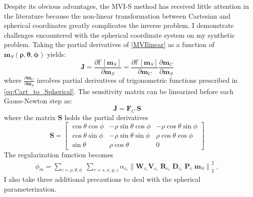 Despite its obvious advantages, the MVI-S method has received little attention in the literature because the non-linear transformation between Cartesian and spherical coordinates greatly complicates the inverse problem.
I demonstrate challenges encountered with the spherical coordinate system on my synthetic problem.
Taking the partial derivatives of \eqref{MVIlinear} as a function of $\mathbf{m}_S( \boldsymbol{\rho}, \boldsymbol{\theta}, \boldsymbol{\phi})$ yields:
\begin{equation} \label{eq:spherical}
\mathbf{J} = \frac{\partial \mathbb{F}[\mathbf{m}_S]}{\partial \mathbf{m}_S} = \frac{\partial \mathbb{F}[\mathbf{m}_S]}{\partial \mathbf{m}_C} \frac{\partial \mathbf{m}_C}{\partial \mathbf{m}_S}
\end{equation}
where $\frac{\partial \mathbf{m}_C}{\partial \mathbf{m}_S}$ involves partial derivatives of trigonometric functions prescribed in \eqref{eq:Cart_to_Spherical}.
The sensitivity matrix can be linearized before each Gauss-Newton step as:
\begin{equation} \label{eq:lin_sph}
\mathbf{J} = \mathbf{F}_C\: \mathbf{S}
\end{equation}
where the matrix $\mathbf{S}$ holds the partial derivatives
\begin{equation} \label{eq:Smatrix}
\mathbf{S} = \begin{bmatrix} \cos{\theta}\cos{\phi} & -\rho\sin{\theta}\cos{\phi} & -\rho\cos{\theta}\sin{\phi} \\
\cos{\theta}\sin{\phi} & -\rho\sin{\theta}\sin{\phi} & \rho\cos{\theta}\cos{\phi} \\
\sin{\theta} & \rho\cos{\theta} & 0 \end{bmatrix}
\end{equation}
The regularization function becomes
\begin{equation} \label{phi_m_sparse_Spherical}
\begin{split}
\phi_m = \sum_{c = \rho,\theta,\phi} \;
\sum_{r = s,x,y,z} \alpha_{c_r} {\|\mathbf{W}_{c_r}\mathbf{V}_{c_r} \;\mathbf{R}_{c_r} \; \mathbf{D}_{c_r} \;\mathbf{P}_{c} \; \mathbf{m}_S\|}^2_2 \;,
\end{split}
\end{equation}
I also take three additional precautions to deal with the spherical parameterization.
